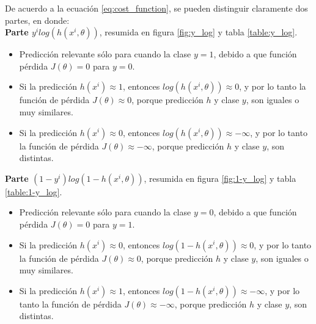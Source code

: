  De acuerdo a la ecuación \ref{eq:cost_function}, se pueden distinguir claramente dos partes, en donde:\\

 \textbf{Parte $ y^{i} log \left( h(x^{i}, \theta)  \right)$},
 resumida en figura \ref{fig:y_log} y tabla \ref{table:y_log}.
 \begin{itemize}
     \item Predicción relevante sólo para cuando la clase $y=1$, debido a que función pérdida $J(\theta) = 0$ para $y=0$.
     \item Si la predicción $h(x^{i}) \approx 1$, entonces $log \left(h(x^{i}, \theta)  \right) \approx 0$, y por lo tanto la función de pérdida $J(\theta) \approx 0$, porque predicción $h$ y clase $y$, son iguales o muy similares.

     \item Si la predicción $h(x^{i}) \approx 0$, entonces $log \left(h(x^{i}, \theta)  \right) \approx -\infty$, y por lo tanto la función de pérdida $J(\theta) \approx -\infty$, porque predicción $h$ y clase $y$, son distintas.

\end{itemize}

\textbf{Parte $ \left( 1-y^{i} \right) log \left(  1 -  h(x^{i}, \theta)  \right)$}, resumida en figura \ref{fig:1-y_log} y tabla \ref{table:1-y_log}.
\begin{itemize}
    \item Predicción relevante sólo para cuando la clase $y=0$, debido a que función pérdida $J(\theta) = 0$ para $y=1$.

    \item Si la predicción $h(x^{i}) \approx 0$, entonces $log \left(1- h(x^{i}, \theta)  \right) \approx 0$, y por lo tanto la función de pérdida $J(\theta) \approx 0$, porque predicción $h$ y clase $y$, son iguales o muy similares.


    \item Si la predicción $h(x^{i}) \approx 1$, entonces $log \left(1- h(x^{i}, \theta)  \right) \approx -\infty$, y por lo tanto la función de pérdida $J(\theta) \approx -\infty$, porque predicción $h$ y clase $y$, son distintas.

\end{itemize}


